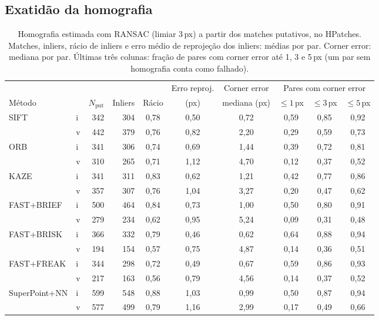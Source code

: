\documentclass[11pt,a4paper]{article}
\newcommand{\px}{\,px}
\begin{document}
\subsection{Exatidão da homografia}
\label{sec:homografia}
\begin{table}[H]
\centering\small
\caption{Homografia estimada com RANSAC (limiar 3\px) a partir dos matches putativos, no HPatches.
Matches, inliers, rácio de inliers e erro médio de reprojeção dos inliers: médias por par. Corner error:
mediana por par. Últimas três colunas: fração de pares com corner error até 1, 3 e 5\px{} (um par sem
homografia conta como falhado).}
\label{tab:homografia}
\setlength{\tabcolsep}{4pt}
\begin{tabular}{llrrcccccc}
\toprule
 & & & & & Erro reproj. & Corner error & \multicolumn{3}{c}{Pares com corner error} \\
\cmidrule(lr){8-10}
Método & & $N_\text{put}$ & Inliers & Rácio & (px) & mediana (px) & $\le 1$\px & $\le 3$\px & $\le 5$\px \\
\midrule
\multirow{2}{*}{SIFT} & i & 342 & 304 & 0,78 & 0,50 & 0,72 & 0,59 & 0,85 & 0,92 \\
 & v & 442 & 379 & 0,76 & 0,82 & 2,20 & 0,29 & 0,59 & 0,73 \\
\multirow{2}{*}{ORB} & i & 341 & 306 & 0,74 & 0,69 & 1,44 & 0,39 & 0,72 & 0,81 \\
 & v & 310 & 265 & 0,71 & 1,12 & 4,70 & 0,12 & 0,37 & 0,52 \\
\multirow{2}{*}{KAZE} & i & 341 & 311 & 0,83 & 0,62 & 1,21 & 0,42 & 0,77 & 0,86 \\
 & v & 357 & 307 & 0,76 & 1,04 & 3,27 & 0,20 & 0,47 & 0,62 \\
\multirow{2}{*}{FAST+BRIEF} & i & 500 & 464 & 0,84 & 0,73 & 1,00 & 0,50 & 0,80 & 0,91 \\
 & v & 279 & 234 & 0,62 & 0,95 & 5,24 & 0,09 & 0,31 & 0,48 \\
\multirow{2}{*}{FAST+BRISK} & i & 366 & 332 & 0,79 & 0,46 & 0,62 & 0,64 & 0,88 & 0,94 \\
 & v & 194 & 154 & 0,57 & 0,75 & 4,87 & 0,14 & 0,36 & 0,51 \\
\multirow{2}{*}{FAST+FREAK} & i & 344 & 298 & 0,72 & 0,49 & 0,67 & 0,59 & 0,86 & 0,93 \\
 & v & 217 & 163 & 0,56 & 0,79 & 4,56 & 0,14 & 0,37 & 0,52 \\
\midrule
\multirow{2}{*}{SuperPoint+NN} & i & 599 & 548 & 0,88 & 1,03 & 0,99 & 0,50 & 0,87 & 0,94 \\
 & v & 577 & 499 & 0,79 & 1,16 & 2,99 & 0,17 & 0,49 & 0,66 \\

\end{tabular}
\end{table}
\end{document}
